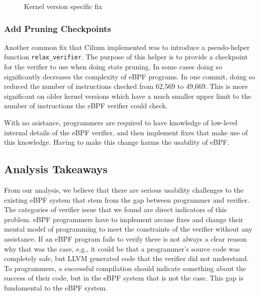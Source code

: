 \begin{figure}
    
    \caption{Kernel version specific fix}
    \label{fig:kernel-version-code}
\end{figure}

\subsubsection{Add Pruning Checkpoints}
Another common fix that Cilium implemented was to introduce a pseudo-helper function \texttt{relax\_verifier}.
The purpose of this helper is to provide a checkpoint for the verifier to use when doing state pruning.
In some cases doing so significantly decreases the complexity of eBPF programs.
In one commit, doing so reduced the number of instructions checked from 62,569 to 49,669.
This is more significant on older kernel versions which have a much smaller upper limit to the number of instructions the eBPF verifier could check.

With no asistance, programmers are required to have knowledge of low-level 
    internal details of the eBPF verifier, and then implement fixes that 
    make use of this knowledge.
Having to make this change harms the usability of eBPF.


\subsection{Analysis Takeaways}
From our analysis, we believe that there are serious usability challenges to the 
    existing eBPF system that stem from the gap between programmer and verifier.
The categories of verifier issue that we found are direct indicators of this problem.
eBPF programmers have to implement arcane fixes and change their mental model of 
    programming to meet the constraints of the verifier without any assistance.
If an eBPF program fails to verify there is not always a clear reason why that was the case, e.g.,
it could be that a programmer's source code was completely safe, but LLVM generated code that the verifier did not understand.
To programmers, a successful compilation should indicate something about the success of their code, but in the eBPF system that is not the case.
This gap is fundamental to the eBPF system.


